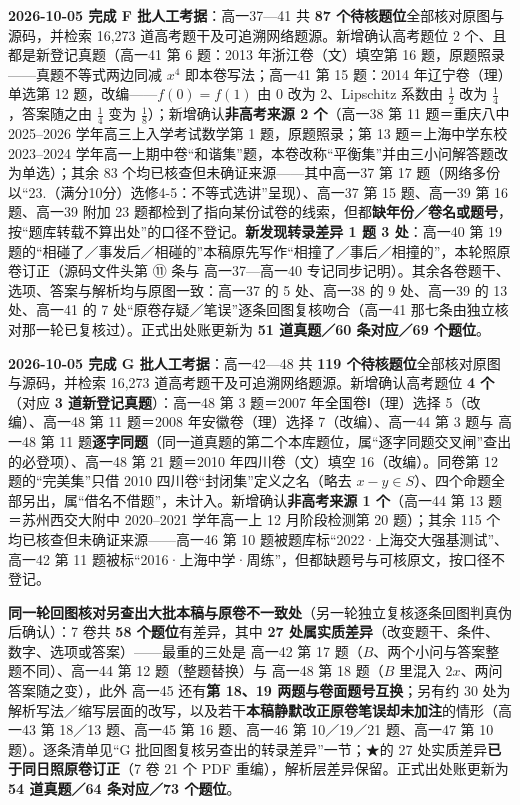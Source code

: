 \documentclass[a4paper,11pt]{article}
\begin{document}
\textbf{2026-10-05 完成 F 批人工考据}：高一37---41 共 \textbf{87 个待核题位}全部核对原图与源码，并检索 16,273 道高考题干及可追溯网络题源。新增确认高考题位 2 个、且都是新登记真题（高一41 第 6 题：2013 年浙江卷（文）填空第 16 题，原题照录------真题不等式两边同减 \(x^4\) 即本卷写法；高一41 第 15 题：2014 年辽宁卷（理）单选第 12 题，改编------\(f(0)=f(1)\) 由 \(0\) 改为 \(2\)、Lipschitz 系数由 \(\frac12\) 改为 \(\frac14\)，答案随之由 \(\frac14\) 变为 \(\frac18\)）；新增确认\textbf{非高考来源 2 个}（高一38 第 11 题＝重庆八中 2025--2026 学年高三上入学考试数学第 1 题，原题照录；第 13 题＝上海中学东校 2023--2024 学年高一上期中卷``和谐集''题，本卷改称``平衡集''并由三小问解答题改为单选）；其余 83 个均已核查但未确证来源------其中高一37 第 17 题（网络多份以``23.（满分10分）选修4-5：不等式选讲''呈现）、高一37 第 15 题、高一39 第 16 题、高一39 附加 23 题都检到了指向某份试卷的线索，但都\textbf{缺年份／卷名或题号}，按``题库转载不算出处''的口径不登记。\textbf{新发现转录差异 1 题 3 处}：高一40 第 19 题的``相碰了／事发后／相碰的''本稿原先写作``相撞了／事后／相撞的''，本轮照原卷订正（源码文件头第 ⑪ 条与 高一37---高一40 专记同步记明）。其余各卷题干、选项、答案与解析均与原图一致：高一37 的 5 处、高一38 的 9 处、高一39 的 13 处、高一41 的 7 处``原卷存疑／笔误''逐条回图复核吻合（高一41 那七条由独立核对那一轮已复核过）。正式出处账更新为 \textbf{51 道真题／60 条对应／69 个题位}。

\textbf{2026-10-05 完成 G 批人工考据}：高一42---48 共 \textbf{119 个待核题位}全部核对原图与源码，并检索 16,273 道高考题干及可追溯网络题源。新增确认高考题位 \textbf{4 个}（对应 \textbf{3 道新登记真题}）：高一48 第 3 题＝2007 年全国卷Ⅰ（理）选择 5（改编）、高一48 第 11 题＝2008 年安徽卷（理）选择 7（改编）、高一44 第 3 题与 高一48 第 11 题\textbf{逐字同题}（同一道真题的第二个本库题位，属``逐字同题交叉闸''查出的必登项）、高一48 第 21 题＝2010 年四川卷（文）填空 16（改编）。同卷第 12 题的``完美集''只借 2010 四川卷``封闭集''定义之名（略去 \(x-y\in S\)）、四个命题全部另出，属``借名不借题''，未计入。新增确认\textbf{非高考来源 1 个}（高一44 第 13 题＝苏州西交大附中 2020--2021 学年高一上 12 月阶段检测第 20 题）；其余 115 个均已核查但未确证来源------高一46 第 10 题被题库标``2022·上海交大强基测试''、高一42 第 11 题被标``2016·上海中学·周练''，但都缺题号与可核原文，按口径不登记。

\textbf{同一轮回图核对另查出大批本稿与原卷不一致处}（另一轮独立复核逐条回图判真伪后确认）：7 卷共 \textbf{58 个题位}有差异，其中 \textbf{27 处属实质差异}（改变题干、条件、数字、选项或答案）------最重的三处是 高一42 第 17 题（\(B\)、两个小问与答案整题不同）、高一44 第 12 题（整题替换）与 高一48 第 18 题（\(B\) 里混入 \(2x\)、两问答案随之变），此外 高一45 还有\textbf{第 18、19 两题与卷面题号互换}；另有约 30 处为解析写法／缩写层面的改写，以及若干\textbf{本稿静默改正原卷笔误却未加注}的情形（高一43 第 18／13 题、高一45 第 16 题、高一46 第 10／19／21 题、高一47 第 10 题）。逐条清单见``G 批回图复核另查出的转录差异''一节；★的 27 处实质差异\textbf{已于同日照原卷订正}（7 卷 21 个 PDF 重编），解析层差异保留。正式出处账更新为 \textbf{54 道真题／64 条对应／73 个题位}。
\end{document}
